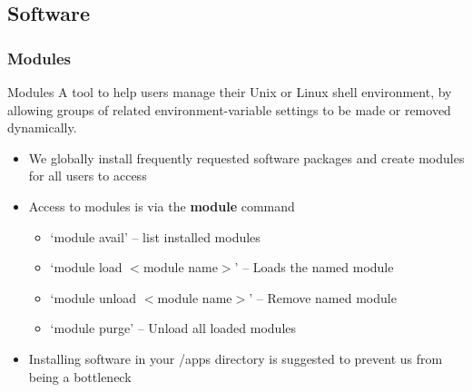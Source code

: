 \documentclass[t,hyperref={pdfpagelabels=false}]{beamer}
\newcommand{\ctilde}{{\fontfamily{ptm}\selectfont\texttildelow}}
\begin{document}
\subsection{Software}
\begin{frame}
	\frametitle{Modules}
	\begin{block}{Modules}\tiny
	A tool to help users manage their Unix or Linux shell environment, by allowing groups of related environment-variable settings to be made or removed dynamically.\footnotemark
	
	\end{block}
	\begin{itemize}
		\item We globally install frequently requested software packages and create modules for all users to access
		\item Access to modules is via the \textbf{module} command
		\begin{itemize}\footnotesize
			\item `module avail' -- list installed modules
			\item `module load $<$module name$>$' -- Loads the named module
			\item `module unload $<$module name$>$' -- Remove named module
			\item `module purge' -- Unload all loaded modules
		\end{itemize}
		\item Installing software in your \ctilde{}/apps directory is suggested to prevent us from being a bottleneck
	\end{itemize}
\end{frame}
\end{document}
